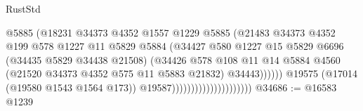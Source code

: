 \begin{lexlean}{RustStd}
\begin{coremodule}
{\begin{coremodule}
{{{{{{{{{{{{{{{{{{{{{{{{{{{{{{{{{{{{{{{{{{{{{{{{{{{{{{{                                                  @5885
                                                  (@18231
                                                    @34373
                                                    @4352
                                                    @1557
                                                    @1229
                                                    @5885
                                                    (@21483
                                                      @34373
                                                      @4352
                                                      @199
                                                      @578
                                                      @1227
                                                      @11
                                                      @5829
                                                      @5884
                                                      (@34427
                                                        @580
                                                        @1227
                                                        @15
                                                        @5829
                                                        @6696
                                                        (@34435 @5829 @34438 @21508)
                                                        (@34426
                                                          @578
                                                          @108
                                                          @11
                                                          @14
                                                          @5884
                                                          @4560
                                                          (@21520
                                                            @34373
                                                            @4352
                                                            @575
                                                            @11
                                                            @5883
                                                            @21832)
                                                          @34443))))))
                                              @19575
                                              (@17014 (@19580 @1543 @1564 @173))
                                              @19587)))))))))))))))))))))
@34686 := @16583 @1239
}}}}}}}}}}}}}}}}}}}}}}}}}}}}}}}}}}}}}}}}}}}}}}}}}}}}}}}
\end{coremodule}}
\end{coremodule}
\end{lexlean}
